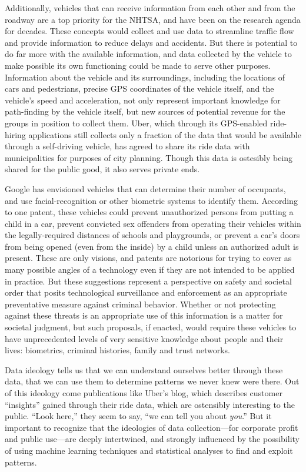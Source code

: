 Additionally, vehicles that can receive information from each other and from the
roadway are a top priority for the NHTSA, and have been on the
research agenda for decades.\cite[p. 11]{wetmore} These concepts would
collect and use data to streamline traffic flow and provide
information to reduce delays and accidents. But there is potential to
do far more with the available information,
and data collected by the vehicle to make possible its own functioning
could be made to serve other purposes. Information about the vehicle
and its surroundings, including the locations of cars and pedestrians,
precise GPS coordinates of the vehicle itself, and the vehicle's speed
and acceleration, not only represent important knowledge for
path-finding by the vehicle itself, but new sources of potential
revenue for the groups in position to collect them. Uber, which
through its GPS-enabled ride-hiring applications still collects only a
fraction of the data that would be available through a self-driving
vehicle, has agreed to share its ride data with municipalities for purposes of
city planning.\cite{uberJardin} Though this data is ostesibly being
shared for the public good, it also serves private ends.

Google has envisioned vehicles that can determine their number of
occupants, and use facial-recognition or other biometric systems to
identify them. According to one patent,\cite{predictPatent} these vehicles could prevent
unauthorized persons from putting a child in a car, prevent convicted
sex offenders from operating their vehicles within the
legally-required distances of schools and playgrounds, or prevent a
car's doors from being opened (even from the inside) by a child unless
an authorized adult is present. These are only visions, and patents
are notorious for trying to cover as many possible angles of a
technology even if they are not intended to be applied in practice.
But these suggestions represent a perspective on safety and societal
order that posits technological surveillance and enforcement as an
appropriate preventative measure against criminal behavior. Whether or not protecting
against these threats is an appropriate use of this information is a
matter for societal judgment, but such proposals, if enacted, would
require these vehicles to have unprecedented levels of very sensitive
knowledge about people and their lives: biometrics, criminal
histories, family and trust networks. 

Data ideology tells us that we can understand ourselves better through
these data, that we can use them to determine patterns we never knew were
there. Out of this ideology come publications like Uber's blog, which
describes customer ``insights'' gained through their ride data, which
are ostensibly interesting to the public. ``Look here,'' they seem to
say, ``we can tell you about \emph{you}.'' But it important to
recognize that the ideologies of data collection---for corporate
profit and public use---are deeply intertwined, and strongly
influenced by the possibility of using machine learning techniques and
statistical analyses to find and exploit patterns.


